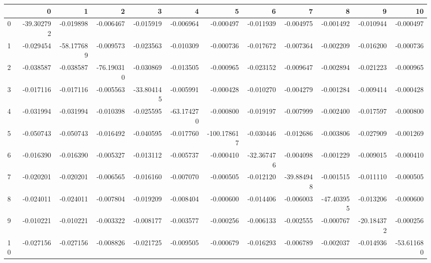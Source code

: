 \begin{tabular}{lrrrrrrrrrrr}
\toprule
{} &          0 &          1 &          2 &          3 &          4 &           5 &          6 &          7 &          8 &          9 &         10 \\
\midrule
0  & -39.302792 &  -0.019898 &  -0.006467 &  -0.015919 &  -0.006964 &   -0.000497 &  -0.011939 &  -0.004975 &  -0.001492 &  -0.010944 &  -0.000497 \\
1  &  -0.029454 & -58.177689 &  -0.009573 &  -0.023563 &  -0.010309 &   -0.000736 &  -0.017672 &  -0.007364 &  -0.002209 &  -0.016200 &  -0.000736 \\
2  &  -0.038587 &  -0.038587 & -76.190310 &  -0.030869 &  -0.013505 &   -0.000965 &  -0.023152 &  -0.009647 &  -0.002894 &  -0.021223 &  -0.000965 \\
3  &  -0.017116 &  -0.017116 &  -0.005563 & -33.804145 &  -0.005991 &   -0.000428 &  -0.010270 &  -0.004279 &  -0.001284 &  -0.009414 &  -0.000428 \\
4  &  -0.031994 &  -0.031994 &  -0.010398 &  -0.025595 & -63.174270 &   -0.000800 &  -0.019197 &  -0.007999 &  -0.002400 &  -0.017597 &  -0.000800 \\
5  &  -0.050743 &  -0.050743 &  -0.016492 &  -0.040595 &  -0.017760 & -100.178617 &  -0.030446 &  -0.012686 &  -0.003806 &  -0.027909 &  -0.001269 \\
6  &  -0.016390 &  -0.016390 &  -0.005327 &  -0.013112 &  -0.005737 &   -0.000410 & -32.367476 &  -0.004098 &  -0.001229 &  -0.009015 &  -0.000410 \\
7  &  -0.020201 &  -0.020201 &  -0.006565 &  -0.016160 &  -0.007070 &   -0.000505 &  -0.012120 & -39.884948 &  -0.001515 &  -0.011110 &  -0.000505 \\
8  &  -0.024011 &  -0.024011 &  -0.007804 &  -0.019209 &  -0.008404 &   -0.000600 &  -0.014406 &  -0.006003 & -47.403955 &  -0.013206 &  -0.000600 \\
9  &  -0.010221 &  -0.010221 &  -0.003322 &  -0.008177 &  -0.003577 &   -0.000256 &  -0.006133 &  -0.002555 &  -0.000767 & -20.184372 &  -0.000256 \\
10 &  -0.027156 &  -0.027156 &  -0.008826 &  -0.021725 &  -0.009505 &   -0.000679 &  -0.016293 &  -0.006789 &  -0.002037 &  -0.014936 & -53.611680 \\
\bottomrule
\end{tabular}

